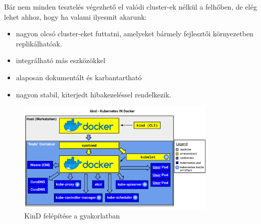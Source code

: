 Bár nem minden tesztelés végezhető el valódi cluster-ek nélkül a felhőben, de elég lehet ahhoz, hogy ha valami ilyesmit akarunk:
\cite{KinD}
\begin{itemize}
    \item nagyon olcsó cluster-eket futtatni, amelyeket bármely fejlesztői környezetben replikálhatóak.
    \item integrálható más eszközökkel
    \item alaposan dokumentált és karbantartható
    \item nagyon stabil, kiterjedt hibakezeléssel rendelkezik.
\end{itemize}

\begin{figure}[ht]
    \centering
         \includegraphics[width=0.85\textwidth]{figures/kubernetes/kind-overview.png}
          \caption{KinD felépítése a gyakorlatban \cite{KinD}}
           \label{kind-overview}
\end{figure}